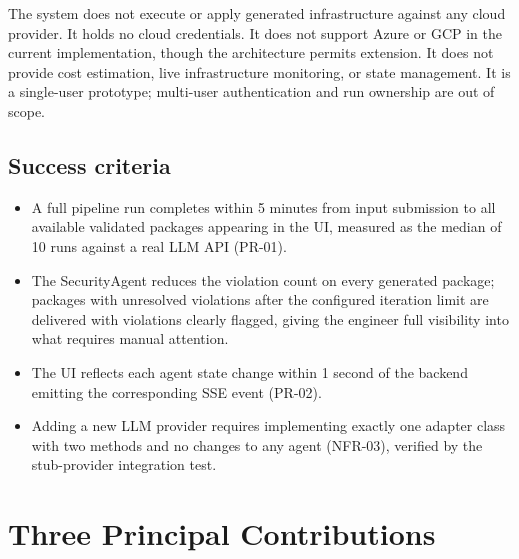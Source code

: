 The system does not execute or apply generated infrastructure against any
cloud provider. It holds no cloud credentials. It does not support Azure
or GCP in the current implementation, though the architecture permits
extension. It does not provide cost estimation, live infrastructure
monitoring, or state management. It is a single-user prototype; multi-user
authentication and run ownership are out of scope.

\subsection*{Success criteria}

\begin{itemize}
  \item A full pipeline run completes within 5 minutes from input submission
    to all available validated packages appearing in the UI, measured as
    the median of 10 runs against a real LLM API (PR-01).
  \item The SecurityAgent reduces the violation count on every generated
    package; packages with unresolved violations after the configured
    iteration limit are delivered with violations clearly flagged, giving
    the engineer full visibility into what requires manual attention.
  \item The UI reflects each agent state change within 1 second of the
    backend emitting the corresponding SSE event (PR-02).
  \item Adding a new LLM provider requires implementing exactly one adapter
    class with two methods and no changes to any agent (NFR-03), verified
    by the stub-provider integration test.
\end{itemize}

\section{Three Principal Contributions}
\label{sec:contributions}

